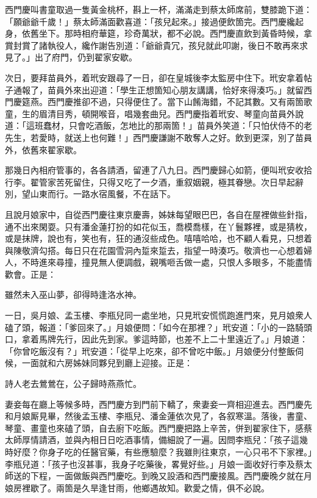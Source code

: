 西門慶叫書童取過一隻黃金桃杯，斟上一杯，滿滿走到蔡太師席前，雙膝跪下道：「願爺爺千歲！」蔡太師滿面歡喜道：「孩兒起來。」接過便飲箇完。西門慶纔起身，依舊坐下。那時相府華筵，珍奇萬狀，都不必說。西門慶直飲到黃昏時候，拿賞封賞了諸執役人，纔作謝告別道：「爺爺貴冗，孩兒就此叩謝，後日不敢再來求見了。」出了府門，仍到翟家安歇。

次日，要拜苗員外，着玳安跟尋了一日，卻在皇城後李太監房中住下。玳安拿着帖子通報了，苗員外來出迎道：「學生正想箇知心朋友講講，恰好來得湊巧。」就留西門慶筵燕。西門慶推卻不過，只得便住了。當下山餚海錯，不記其數。又有兩箇歌童，生的眉清目秀，頓開喉音，唱幾套曲兒。西門慶指着玳安、琴童向苗員外說道：「這班蠢材，只會吃酒飯，怎地比的那兩箇！」苗員外笑道：「只怕伏侍不的老先生，若愛時，就送上也何難！」西門慶謙謝不敢奪人之好。飲到更深，別了苗員外，依舊來翟家歇。

那幾日內相府管事的，各各請酒，留連了八九日。西門慶歸心如箭，便叫玳安收拾行李。翟管家苦死留住，只得又吃了一夕酒，重叙姻親，極其眷戀。次日早起辭別，望山東而行。一路水宿風餐，不在話下。

且說月娘家中，自從西門慶往東京慶壽，姊妹每望眼巴巴，各自在屋裡做些針指，通不出來閑耍。只有潘金蓮打扮的如花似玉，喬模喬樣，在丫鬟夥裡，或是猜枚，或是抹牌，說也有，笑也有，狂的通沒些成色。嘻嘻哈哈，也不顧人看見，只想着與陳敬濟勾搭。每日只在花園雪洞內踅來踅去，指望一時湊巧。敬濟也一心想着婦人，不時進來尋撞，撞見無人便調戲，親嘴咂舌做一處，只恨人多眼多，不能盡情歡會。正是：

\begin{myquote}
雖然未入巫山夢，卻得時逢洛水神。
\end{myquote}

一日，吳月娘、孟玉樓、李瓶兒同一處坐地，只見玳安慌慌跑進門來，見月娘衆人磕了頭，報道：「爹回來了。」月娘便問：「如今在那裡？」玳安道：「小的一路騎頭口，拿着馬牌先行，因此先到家。爹這時節，也差不上二十里遠近了。」月娘道：「你曾吃飯沒有？」玳安道：「從早上吃來，卻不曾吃中飯。」月娘便分付整飯伺候，一面就和六房姊妹同夥兒到廳上迎接。正是：

\begin{myquote}
詩人老去鶯鶯在，公子歸時燕燕忙。
\end{myquote}

妻妾每在廳上等候多時，西門慶方到門前下轎了，衆妻妾一齊相迎進去。西門慶先和月娘厮見畢，然後孟玉樓、李瓶兒、潘金蓮依次見了，各叙寒溫。落後，書童、琴童、畫童也來磕了頭，自去廚下吃飯。西門慶把路上辛苦，併到翟家住下，感蔡太師厚情請酒，並與內相日日吃酒事情，備細說了一遍。因問李瓶兒：「孩子這幾時好麼？你身子吃的任醫官藥，有些應驗麼？我雖則往東京，一心只弔不下家裡。」李瓶兒道：「孩子也沒甚事，我身子吃藥後，畧覺好些。」月娘一面收好行李及蔡太師送的下程，一面做飯與西門慶吃。到晚又設酒和西門慶接風。西門慶晚夕就在月娘房裡歇了。兩箇是久旱逢甘雨，他鄉遇故知。歡愛之情，俱不必說。

